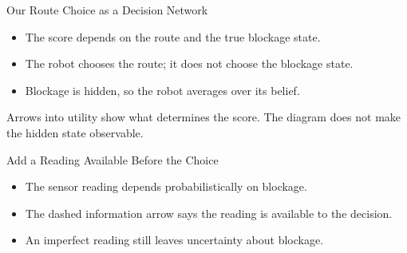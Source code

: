 \documentclass[aspectratio=169,10pt]{beamer}
\begin{document}
\begin{frame}{Our Route Choice as a Decision Network}
  \begin{center}
  \end{center}
  \begin{itemize}
    \item The score depends on the route and the true blockage state.
    \item The robot chooses the route; it does not choose the blockage state.
    \item Blockage is hidden, so the robot averages over its belief.
  \end{itemize}
  \begin{keyidea}
    Arrows into utility show what determines the score. The diagram does not make the hidden state observable.
  \end{keyidea}
\end{frame}

\begin{frame}{Add a Reading Available Before the Choice}
  \begin{center}
  \end{center}
  \begin{itemize}
    \item The sensor reading depends probabilistically on blockage.
    \item The dashed information arrow says the reading is available to the decision.
    \item An imperfect reading still leaves uncertainty about blockage.
  \end{itemize}
\end{frame}
\end{document}
